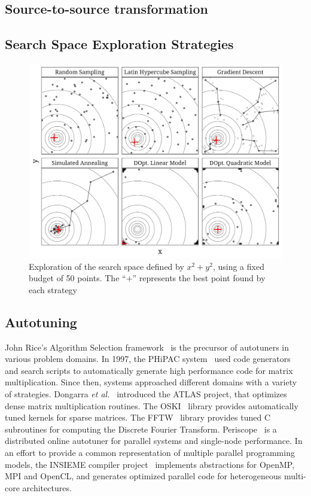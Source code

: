 \documentclass[conference]{IEEEtran}
\begin{document}
\subsection{Source-to-source transformation}
\label{sec:orgb8421e2}
\subsection{Search Space Exploration Strategies}
\label{sec:org710769d}
\begin{center}
\begin{figure}[htbp]
\centering
\includegraphics[width=.95\columnwidth]{./img/sampling_comparison.pdf}
\caption{\label{fig:org7a149fd}
Exploration of the search space defined by \(x^2 + y^2\), using a fixed budget of 50 points. The ``\(+\)'' represents the best point found by each strategy}
\end{figure}
\end{center}
\subsection{Autotuning}
\label{sec:org57b7aa7}
John Rice's Algorithm Selection framework~\cite{rice1976algorithm} is the
precursor of autotuners in various problem domains. In 1997, the PHiPAC
system~\cite{bilmes1997optimizing} used code generators and search scripts
to automatically generate high performance code for matrix multiplication. Since
then, systems approached different domains with a variety of strategies.
Dongarra \emph{et al.}~\cite{dongarra1998automatically} introduced the ATLAS
project, that optimizes dense matrix multiplication routines. The
OSKI~\cite{vuduc2005oski} library provides automatically tuned kernels for
sparse matrices. The FFTW~\cite{frigo1998fftw} library provides tuned C
subroutines for computing the Discrete Fourier Transform.
Periscope~\cite{gerndt2010automatic} is a distributed online autotuner for
parallel systems and single-node performance. In an effort to provide a common
representation of multiple parallel programming models, the INSIEME compiler
project~\cite{jordan2012multi} implements abstractions for OpenMP, MPI and
OpenCL, and generates optimized parallel code for heterogeneous multi-core
architectures.
\end{document}
